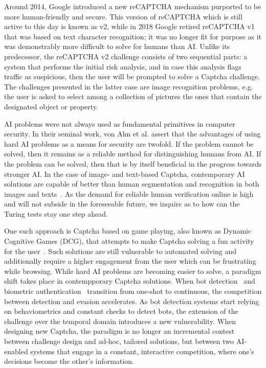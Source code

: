 Around 2014, Google introduced a new reCAPTCHA mechanism purported to be more human-friendly and secure.
This version of reCAPTCHA which is still active to this day is known as v2, while in 2018 Google retired reCAPTCHA v1 that was based on text character recognition; it was no longer fit for purpose as it was demonstrably more difficult to solve for humans than AI.
Unlike its predecessor, the reCAPTCHA v2 challenge consists of two sequential parts: a system that performs the initial risk analysis, and in case this analysis flags traffic as suspicious, then the user will be prompted to solve a Captcha challenge.
The challenges presented in the latter case are image recognition problems, e.g. the user is asked to select among a collection of pictures the ones that contain the designated object or property.

AI problems were not always used as fundamental primitives in computer security.
In their seminal work, von Ahn et al. \cite{von2003captcha} assert that the advantages of using hard AI problems as a means for security are twofold.
If the problem cannot be solved, then it remains as a reliable method for distinguishing humans from AI.
If the problem can be solved, then that is by itself beneficial in the progress towards stronger AI.
In the case of image- and text-based Captcha, contemporary AI solutions are capable of better than human segmentation and recognition in both images and texts~\cite{bursztein2014end, sivakorn2016robot, karpathy2015deep}.
As the demand for reliable human verification online is high and will not subside in the foreseeable future, we inquire as to how can the Turing tests stay one step ahead.

One such approach is Captcha based on game playing, also known as Dynamic Cognitive Games (DCG), that attempts to make Captcha solving a fun activity for the user~\cite{mohamed2014three}.
Such solutions are still vulnerable to automated solving and additionally require a higher engagement from the user which can be frustrating while browsing.
While hard AI problems are becoming easier to solve, a paradigm shift takes place in contempporary Captcha solutions. 
When bot detection~\cite{d2014avatar} and biometric authentication~\cite{fridman2015multi} transition from one-shot to continuous, the competition between detection and evasion accelerates.
As bot detection systems start relying on behaviometrics and constant checks to detect bots, the extension of the challenge over the temporal domain introduces a new vulnerability.
When designing new Captcha, the paradigm is no longer an incremental contest between challenge design and ad-hoc, tailored solutions, but between two AI-enabled systems that engage in a constant, interactive competition, where one's decisions become the other's information.

